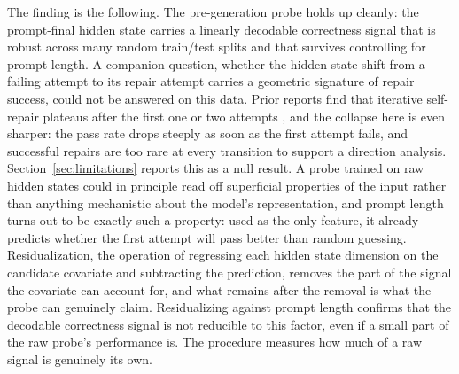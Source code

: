 The finding is the following. The pre-generation probe holds up cleanly: the prompt-final hidden state carries a linearly decodable correctness signal that is robust across many random train/test splits and that survives controlling for prompt length.
A companion question, whether the hidden state shift from a failing attempt to its repair attempt carries a geometric signature of repair success, could not be answered on this data.
Prior reports find that iterative self-repair plateaus after the first one or two attempts \citep{arimbur2026howmanytries}, and the collapse here is even sharper: the pass rate drops steeply as soon as the first attempt fails, and successful repairs are too rare at every transition to support a direction analysis. Section~\ref{sec:limitations} reports this as a null result.
A probe trained on raw hidden states could in principle read off superficial properties of the input rather than anything mechanistic about the model's representation, and prompt length turns out to be exactly such a property: used as the only feature, it already predicts whether the first attempt will pass better than random guessing.
Residualization, the operation of regressing each hidden state dimension on the candidate covariate and subtracting the prediction, removes the part of the signal the covariate can account for, and what remains after the removal is what the probe can genuinely claim.
Residualizing against prompt length confirms that the decodable correctness signal is not reducible to this factor, even if a small part of the raw probe's performance is. The procedure measures how much of a raw signal is genuinely its own.